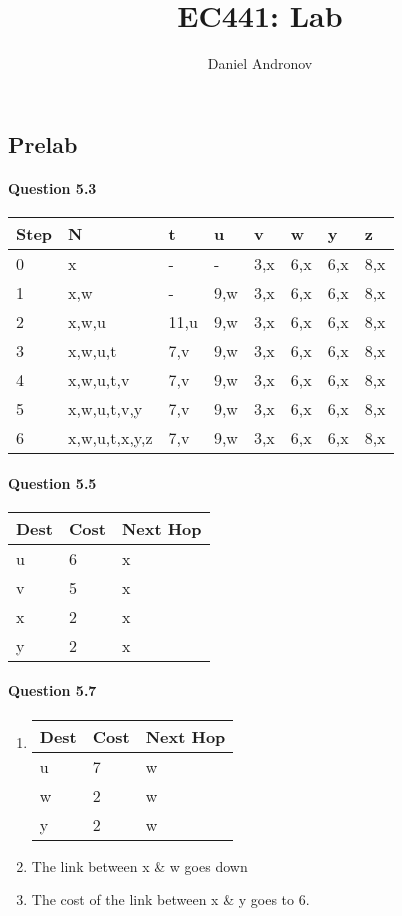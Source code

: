 \documentclass[12pt]{article}
\title{EC441: Lab \hwNum{}}
\author{Daniel Andronov}
\date{\displaydate{date}}
\begin{document}
\maketitle
\newpage

\subsection{Prelab}
\paragraph{Question 5.3}
\begin{tabular} {  l | l | l | l | l | l | l | l }
	Step & N 			& t 		& u 		& v 		& w 		& y 		& z \\ \hline
	0      & x 			& -		& -		& 3,x 		& 6,x 		& 6,x 		& 8,x \\ 
	1      & x,w 			& - 		& 9,w 		& 3,x 		& 6,x 		& 6,x 		& 8,x \\ 
	2      & x,w,u 		& 11,u     	& 9,w 		& 3,x 		& 6,x 		& 6,x 		& 8,x \\ 
	3      & x,w,u,t 		& 7,v	     	& 9,w		& 3,x 		& 6,x 		& 6,x 		& 8,x \\ 
	4      & x,w,u,t,v 		& 7,v 	     	& 9,w		& 3,x 		& 6,x 		& 6,x 		& 8,x \\ 
	5      & x,w,u,t,v,y 		& 7,v        	& 9,w 		& 3,x 		& 6,x 		& 6,x 		& 8,x \\ 
	6      & x,w,u,t,x,y,z 	& 7,v        	& 9,w 		& 3,x 		& 6,x 		& 6,x 		& 8,x \\ 
\end{tabular}

\paragraph{Question 5.5}
\begin{tabular}{ l | l | l }
	Dest	&Cost		&Next Hop \\ \hline
	u 	&6		&x \\
	v	&5		&x \\
	x 	&2 		&x \\ 
	y 	&2 		&x \\
\end{tabular}

\paragraph{Question 5.7}
\begin{enumerate}[label={Part \alph*)},leftmargin=*,align=left]
	\item
		\begin{tabular}{ l | l | l }
			Dest	&Cost 	&Next Hop \\ \hline
			u 	&7		&w \\
			w	&2 		&w \\
			y 	&2		&w \\
		\end{tabular}
	\item The link between x \& w goes down
	\item The cost of the link between x \& y goes to 6.
\end{enumerate}
\end{document}
